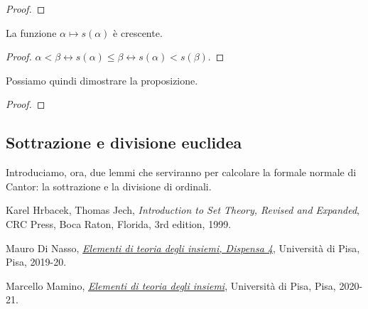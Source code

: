 \documentclass[11pt]{scrartcl}
\begin{document}
\begin{proof}
	
\end{proof}

\begin{note}
	La funzione $\alpha \mapsto s(\alpha)$ è crescente.
\end{note}

\begin{proof}
	$\alpha < \beta \leftrightarrow s(\alpha) \leq \beta \leftrightarrow s(\alpha) < s(\beta)$.
\end{proof}

Possiamo quindi dimostrare la proposizione.

\begin{proof}
	
\end{proof}

\subsection{Sottrazione e divisione euclidea}
Introduciamo, ora, due lemmi che serviranno per calcolare la formale normale di Cantor: la sottrazione e la divisione di ordinali.


\pagebreak
\begin{thebibliography}{9}
	Karel Hrbacek, Thomas Jech,
	\textit{Introduction to Set Theory, Revised and Expanded},
	CRC Press, Boca Raton, Florida,
	3rd edition,
	1999.

	Mauro Di Nasso,
	\href{https://people.dm.unipi.it/dinasso/ETI/dispensa-04ss.pdf}{\textit{Elementi di teoria degli insiemi, Dispensa 4}},
	Università di Pisa, Pisa,
	2019-20.


	Marcello Mamino,
	\href{https://ciovil.li/eti20/}{\textit{Elementi di teoria degli insiemi}},
	Università di Pisa, Pisa,
	2020-21.
\end{thebibliography}
\end{document}
